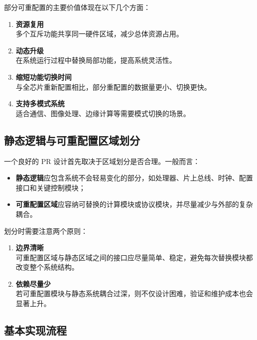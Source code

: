 部分可重配置的主要价值体现在以下几个方面：

\begin{enumerate}
\def\labelenumi{\arabic{enumi}.}
\item
  \textbf{资源复用}\\
  多个互斥功能共享同一硬件区域，减少总体资源占用。
\item
  \textbf{动态升级}\\
  在系统运行过程中替换局部功能，提高系统灵活性。
\item
  \textbf{缩短功能切换时间}\\
  与全芯片重新配置相比，部分重配置的数据量更小、切换更快。
\item
  \textbf{支持多模式系统}\\
  适合通信、图像处理、边缘计算等需要模式切换的场景。
\end{enumerate}

\subsection{静态逻辑与可重配置区域划分}\label{ux9759ux6001ux903bux8f91ux4e0eux53efux91cdux914dux7f6eux533aux57dfux5212ux5206}

一个良好的 PR 设计首先取决于区域划分是否合理。一般而言：

\begin{itemize}
\tightlist
\item
  \textbf{静态逻辑}应包含系统不会轻易变化的部分，如处理器、片上总线、时钟、配置接口和关键控制模块；
\item
  \textbf{可重配置区域}应容纳可替换的计算模块或协议模块，并尽量减少与外部的复杂耦合。
\end{itemize}

划分时需要注意两个原则：

\begin{enumerate}
\def\labelenumi{\arabic{enumi}.}
\item
  \textbf{边界清晰}\\
  可重配置区域与静态区域之间的接口应尽量简单、稳定，避免每次替换模块都改变整个系统结构。
\item
  \textbf{依赖尽量少}\\
  若可重配置模块与静态系统耦合过深，则不仅设计困难，验证和维护成本也会显著上升。
\end{enumerate}

\subsection{基本实现流程}\label{ux57faux672cux5b9eux73b0ux6d41ux7a0b}


